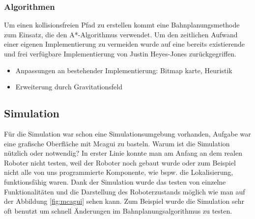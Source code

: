 \subsubsection{Algorithmen}
\authorsection{\editorjulian}

Um einen kollisionsfreien Pfad zu erstellen kommt eine Bahnplanungsmethode zum Einsatz, die den A*-Algorithmus verwendet. Um den zeitlichen Aufwand einer eigenen Implementierung zu vermeiden wurde auf eine bereits existierende und frei verfügbare Implementierung von Justin Heyes-Jones zurückgegriffen.


\begin{itemize}
		\item Anpassungen an bestehender Implementierung: Bitmap karte, Heuristik
		\item Erweiterung durch Gravitationsfeld
\end{itemize}

\subsection{Simulation}
\label{simulation_subsec}
\authorsection{\editoroier}

Für die Simulation war schon eine Simulationsumgebung vorhanden, Aufgabe war eine grafische Oberfläche mit Mcagui zu basteln.
Warum ist die Simulation nützlich oder notwendig? In erster Linie konnte man am Anfang an dem realen Roboter nicht testen, weil der Roboter noch gebaut wurde oder zum Beispiel nicht alle von uns programmierte Komponente, wie bspw. die Lokalisierung, funktionsfähig waren. Dank der Simulation wurde das testen von einzelne Funktionalitäten und die Darstellung des Roboterzustands möglich wie man auf der Abbildung \ref{fig:mcagui} sehen kann. Zum Beispiel wurde die Simulation sehr oft benutzt um schnell Änderungen im Bahnplanungsalgorithmus zu testen.

